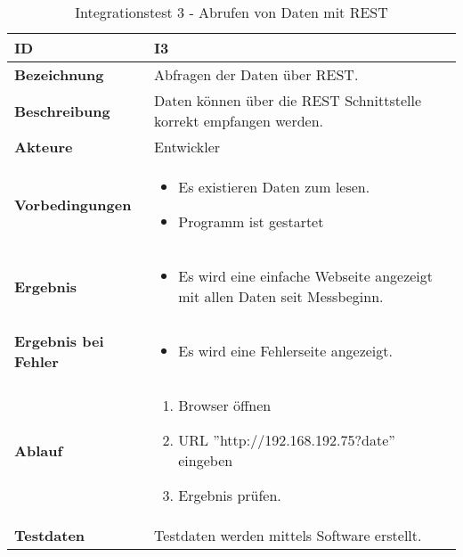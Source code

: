 \begin{table}[H]
    \begin{tabularx}{\textwidth}{ | p{} | p{} |} \hline
        \rowcolor{gray!50}
        \textbf{ID} & \textbf{I3}\\ \hline
        \textbf{Bezeichnung} & 
        Abfragen der Daten über REST.\\ \hline
        \textbf{Beschreibung} & 
        Daten können über die REST Schnittstelle korrekt empfangen werden.\\ \hline
        \textbf{Akteure} &
        Entwickler\\ \hline
        \textbf{Vorbedingungen} &
        \begin{itemize}
            \item Es existieren Daten zum lesen.
            \item Programm ist gestartet
        \end{itemize}\\ \hline
        \textbf{Ergebnis} &        
        \begin{itemize}
            \item Es wird eine einfache Webseite angezeigt mit allen Daten seit Messbeginn.
        \end{itemize}\\ \hline
        \textbf{Ergebnis bei Fehler} &
        \begin{itemize}
            \item Es wird eine Fehlerseite angezeigt.
        \end{itemize}\\ \hline
        \textbf{Ablauf} &
        \begin{enumerate}
            \item Browser öffnen
            \item URL ''http://192.168.192.75?date'' eingeben
            \item Ergebnis prüfen.
        \end{enumerate}\\ \hline
        \textbf{Testdaten} &
        Testdaten werden mittels Software erstellt.\\ \hline
    \end{tabularx}
    \caption{Integrationstest 3 - Abrufen von Daten mit REST}
    \label{tab:inttest3}
\end{table}

\renewcommand{\labelitemi}{$\bullet$}